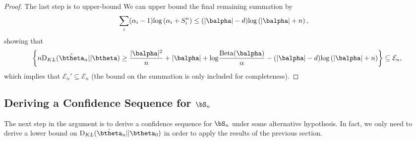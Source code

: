 \documentclass[11pt]{article}
\def\log{{\rm log}}
\newcommand{\Beta}{\mathrm{Beta}}
\newcommand{\KL}{\mathrm{D}_{KL}}
\begin{document}
\begin{proof}
The last step is to upper-bound
We can upper bound the final remaining summation by
\begin{align*}
  \sum_i(\alpha_i-1)\log
  \left(
  \alpha_i + S_i^n
  \right)
  &\leq
    (|\balpha|-d)\log
    \left(
    |\balpha|+n
    \right),
\end{align*}
showing that
\[
      \left\{
    n \KL(\hat\btheta_n|| \btheta)
    \geq
      \frac{|\balpha|^2}{n} + |\balpha|
      +\log\frac{\Beta(\balpha)}{\alpha}
      -
          (|\balpha|-d)\log
    \left(
    |\balpha|+n
    \right)
  \right\}
  \subseteq \mathcal E_n,
\]
which implies that $\mathcal E_n' \subseteq \mathcal E_n$ (the bound on the summation is only included for completeness).
\end{proof}

\subsection{Deriving a Confidence Sequence for $\bS_n$}
The next step in the argument is to derive a confidence sequence for $\bS_n$ under some alternative hypothesis.
In fact, we only need to derive a lower bound on $\KL (\hat\btheta_n||\btheta_0)$ in order to apply the results of the previous section.
\end{document}
